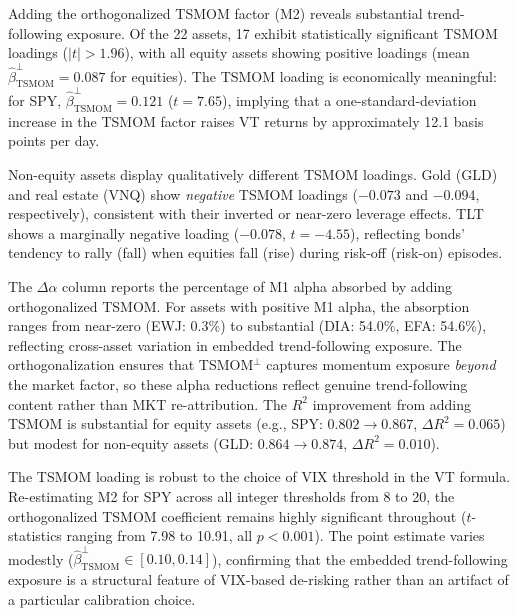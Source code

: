 \documentclass[12pt,a4paper]{article}
\begin{document}
Adding the orthogonalized TSMOM factor (M2) reveals substantial trend-following exposure. Of the 22 assets, 17 exhibit statistically significant TSMOM loadings ($|t| > 1.96$), with all equity assets showing positive loadings (mean $\hat{\beta}_{\text{TSMOM}}^{\perp} = 0.087$ for equities). The TSMOM loading is economically meaningful: for SPY, $\hat{\beta}_{\text{TSMOM}}^{\perp} = 0.121$ ($t = 7.65$), implying that a one-standard-deviation increase in the TSMOM factor raises VT returns by approximately 12.1 basis points per day.

Non-equity assets display qualitatively different TSMOM loadings. Gold (GLD) and real estate (VNQ) show \textit{negative} TSMOM loadings ($-0.073$ and $-0.094$, respectively), consistent with their inverted or near-zero leverage effects. TLT shows a marginally negative loading ($-0.078$, $t = -4.55$), reflecting bonds' tendency to rally (fall) when equities fall (rise) during risk-off (risk-on) episodes.

The $\Delta\alpha$ column reports the percentage of M1 alpha absorbed by adding orthogonalized TSMOM. For assets with positive M1 alpha, the absorption ranges from near-zero (EWJ: 0.3\%) to substantial (DIA: 54.0\%, EFA: 54.6\%), reflecting cross-asset variation in embedded trend-following exposure. The orthogonalization ensures that TSMOM$^{\perp}$ captures momentum exposure \textit{beyond} the market factor, so these alpha reductions reflect genuine trend-following content rather than MKT re-attribution. The $R^2$ improvement from adding TSMOM is substantial for equity assets (e.g., SPY: $0.802 \to 0.867$, $\Delta R^2 = 0.065$) but modest for non-equity assets (GLD: $0.864 \to 0.874$, $\Delta R^2 = 0.010$).

The TSMOM loading is robust to the choice of VIX threshold in the VT formula. Re-estimating M2 for SPY across all integer thresholds from 8 to 20, the orthogonalized TSMOM coefficient remains highly significant throughout ($t$-statistics ranging from 7.98 to 10.91, all $p < 0.001$). The point estimate varies modestly ($\hat{\beta}_{\text{TSMOM}}^{\perp} \in [0.10, 0.14]$), confirming that the embedded trend-following exposure is a structural feature of VIX-based de-risking rather than an artifact of a particular calibration choice.
\end{document}
